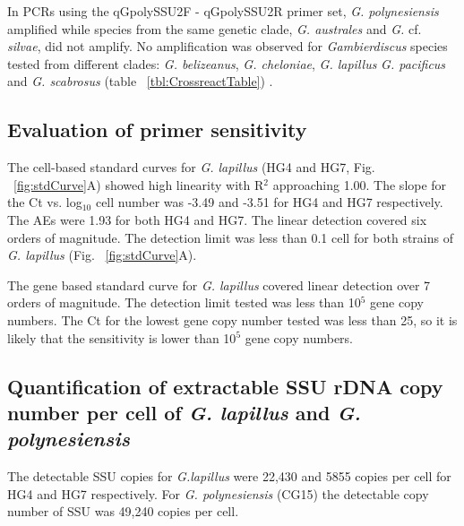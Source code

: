 \documentclass[12pt]{article}
\begin{document}
In PCRs using the qGpolySSU2F - qGpolySSU2R primer set, \emph{G. polynesiensis} amplified while species from the same genetic clade, \emph{G. australes} and \emph{G.} cf. \emph{silvae}, did not amplify. No amplification was observed for \emph{Gambierdiscus} species tested from different clades: \emph{G. belizeanus}, \emph{G. cheloniae}, \emph{G. lapillus }\emph{G. pacificus} and \emph{G. scabrosus} (table ~\ref{tbl:CrossreactTable}) \citep{kretzschmar2016characterization}.


 
\subsection*{Evaluation of primer sensitivity}
The cell-based standard curves for \emph{G. lapillus} (HG4 and HG7, Fig. ~\ref{fig:stdCurve}A) showed high linearity with R$^{2}$ approaching 1.00. The slope for the Ct vs. log$_{10}$ cell number was -3.49 and -3.51 for HG4 and HG7 respectively. The AEs were 1.93 for both HG4 and HG7. The linear detection covered six orders of magnitude. The detection limit was less than 0.1 cell for both strains of \emph{G. lapillus} (Fig. ~\ref{fig:stdCurve}A).



The gene based standard curve for \emph{G. lapillus} covered linear detection over 7 orders of magnitude. The detection limit tested was less than 10$^{5}$ gene copy numbers. The Ct for the lowest gene copy number tested was less than 25, so it is likely that the sensitivity is lower than 10$^{5}$ gene copy numbers.



\subsection*{Quantification of extractable SSU rDNA copy number per cell of \emph{G. lapillus} and \emph{G. polynesiensis}}
The detectable SSU copies for \emph{G.lapillus} were 22,430 and 5855 copies per cell for HG4 and HG7 respectively. For \emph{G. polynesiensis} (CG15) the detectable copy number of SSU was 49,240 copies per cell.
\end{document}
